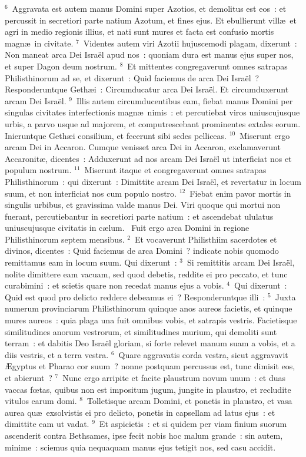 ${}^{6}$~Aggravata est autem manus Domini super Azotios, et demolitus est eos~: et percussit in secretiori parte natium Azotum, et fines ejus. Et ebullierunt vill\ae\ et agri in medio regionis illius, et nati sunt mures et facta est confusio mortis magn\ae\ in civitate.
${}^{7}$~Videntes autem viri Azotii hujuscemodi plagam, dixerunt~: Non maneat arca Dei Isra\"el apud nos~: quoniam dura est manus ejus super nos, et super Dagon deum nostrum.
${}^{8}$~Et mittentes congregaverunt omnes satrapas Philisthinorum ad se, et dixerunt~: Quid faciemus de arca Dei Isra\"el~? Responderuntque Geth\ae i~: Circumducatur arca Dei Isra\"el. Et circumduxerunt arcam Dei Isra\"el.
${}^{9}$~Illis autem circumducentibus eam, fiebat manus Domini per singulas civitates interfectionis magn\ae\ nimis~: et percutiebat viros uniuscujusque urbis, a parvo usque ad majorem, et computrescebant prominentes extales eorum. Inieruntque Geth\ae i consilium, et fecerunt sibi sedes pelliceas.
${}^{10}$~Miserunt ergo arcam Dei in Accaron. Cumque venisset arca Dei in Accaron, exclamaverunt Accaronit\ae , dicentes~: Adduxerunt ad nos arcam Dei Isra\"el ut interficiat nos et populum nostrum.
${}^{11}$~Miserunt itaque et congregaverunt omnes satrapas Philisthinorum~: qui dixerunt~: Dimittite arcam Dei Isra\"el, et revertatur in locum suum, et non interficiat nos cum populo nostro.
${}^{12}$~Fiebat enim pavor mortis in singulis urbibus, et gravissima valde manus Dei. Viri quoque qui mortui non fuerant, percutiebantur in secretiori parte natium~: et ascendebat ululatus uniuscujusque civitatis in c\ae lum.
~\lettrine[lines=10,image=true,loversize=0.05,lraise=-0.03]{F}{}uit ergo arca Domini in regione Philisthinorum septem mensibus.
${}^{2}$~Et vocaverunt Philisthiim sacerdotes et divinos, dicentes~: Quid faciemus de arca Domini~? indicate nobis quomodo remittamus eam in locum suum. Qui dixerunt~:
${}^{3}$~Si remittitis arcam Dei Isra\"el, nolite dimittere eam vacuam, sed quod debetis, reddite ei pro peccato, et tunc curabimini~: et scietis quare non recedat manus ejus a vobis.
${}^{4}$~Qui dixerunt~: Quid est quod pro delicto reddere debeamus ei~? Responderuntque illi~:
${}^{5}$~Juxta numerum provinciarum Philisthinorum quinque anos aureos facietis, et quinque mures aureos~: quia plaga una fuit omnibus vobis, et satrapis vestris. Facietisque similitudines anorum vestrorum, et similitudines murium, qui demoliti sunt terram~: et dabitis Deo Isra\"el gloriam, si forte relevet manum suam a vobis, et a diis vestris, et a terra vestra.
${}^{6}$~Quare aggravatis corda vestra, sicut aggravavit \AE gyptus et Pharao cor suum~? nonne postquam percussus est, tunc dimisit eos, et abierunt~?
${}^{7}$~Nunc ergo arripite et facite plaustrum novum unum~: et duas vaccas fœtas, quibus non est impositum jugum, jungite in plaustro, et recludite vitulos earum domi.
${}^{8}$~Tolletisque arcam Domini, et ponetis in plaustro, et vasa aurea qu\ae\ exsolvistis ei pro delicto, ponetis in capsellam ad latus ejus~: et dimittite eam ut vadat.
${}^{9}$~Et aspicietis~: et si quidem per viam finium suorum ascenderit contra Bethsames, ipse fecit nobis hoc malum grande~: sin autem, minime~: sciemus quia nequaquam manus ejus tetigit nos, sed casu accidit.


